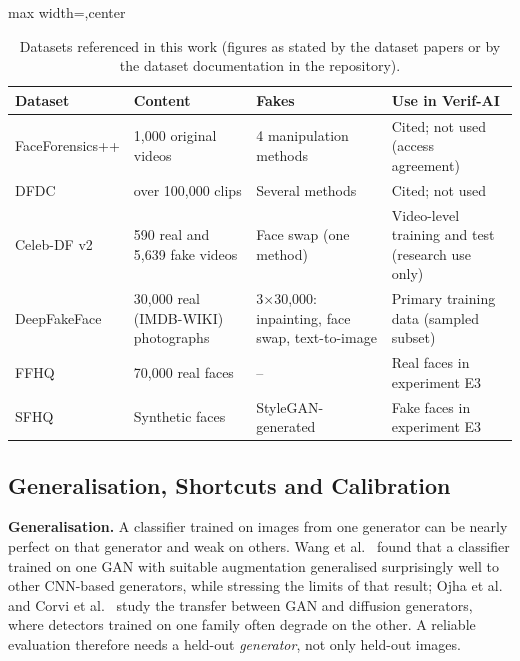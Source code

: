 \begin{table}[ht]
\centering
\caption[Datasets referenced in this work (figures as stated by the dataset papers or by the dataset]{Datasets referenced in this work (figures as stated by the dataset papers or by the dataset documentation in the repository).}
\label{tab:datasets}
\small
\begin{adjustbox}{max width=\linewidth,center}
\begin{tabular}{|p{2.6cm}|p{3.0cm}|p{2.9cm}|p{3.4cm}|}
\hline
\textbf{Dataset} & \textbf{Content} & \textbf{Fakes} & \textbf{Use in Verif-AI} \\ \hline
FaceForensics++ \citep{rossler2019ff} & 1{,}000 original videos & 4 manipulation methods & Cited; not used (access agreement) \\ \hline
DFDC \citep{dolhansky2020dfdc} & over 100{,}000 clips & Several methods & Cited; not used \\ \hline
Celeb-DF v2 \citep{li2020celebdf} & 590 real and 5{,}639 fake videos & Face swap (one method) & Video-level training and test (research use only) \\ \hline
DeepFakeFace \citep{song2023dff} & 30{,}000 real (IMDB-WIKI) photographs \citep{rothe2018imdbwiki} & 3$\times$30{,}000: inpainting, face swap, text-to-image & Primary training data (sampled subset) \\ \hline
FFHQ \citep{karras2019stylegan} & 70{,}000 real faces & -- & Real faces in experiment E3 \\ \hline
SFHQ \citep{sfhq2022} & Synthetic faces & StyleGAN-generated & Fake faces in experiment E3 \\ \hline
\end{tabular}
\end{adjustbox}
\end{table}

\subsection{Generalisation, Shortcuts and Calibration}
\label{sec:shortcuts}
\textbf{Generalisation.} A classifier trained on images from one generator can be nearly perfect on that generator and weak on others.
Wang et al.\ \citep{wang2020cnn} found that a classifier trained on one GAN with suitable augmentation generalised surprisingly well to
other CNN-based generators, while stressing the limits of that result; Ojha et al.\ \citep{ojha2023universal} and Corvi et al.\ \citep{corvi2023diffusion} study the transfer between GAN and diffusion generators, where detectors trained on one family often degrade on
the other. A reliable evaluation therefore needs a held-out \emph{generator}, not only held-out images.

